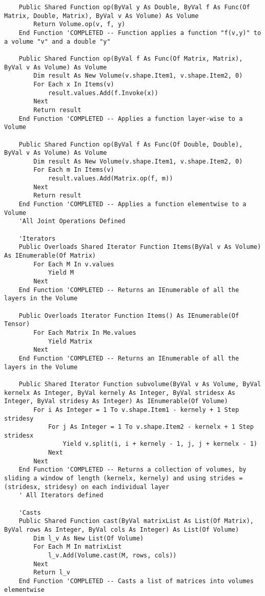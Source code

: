 \begin{verbatim}
    Public Shared Function op(ByVal y As Double, ByVal f As Func(Of Matrix, Double, Matrix), ByVal v As Volume) As Volume
        Return Volume.op(v, f, y)
    End Function 'COMPLETED -- Function applies a function "f(v,y)" to a volume "v" and a double "y"

    Public Shared Function op(ByVal f As Func(Of Matrix, Matrix), ByVal v As Volume) As Volume
        Dim result As New Volume(v.shape.Item1, v.shape.Item2, 0)
        For Each x In Items(v)
            result.values.Add(f.Invoke(x))
        Next
        Return result
    End Function 'COMPLETED -- Applies a function layer-wise to a Volume

    Public Shared Function op(ByVal f As Func(Of Double, Double), ByVal v As Volume) As Volume
        Dim result As New Volume(v.shape.Item1, v.shape.Item2, 0)
        For Each m In Items(v)
            result.values.Add(Matrix.op(f, m))
        Next
        Return result
    End Function 'COMPLETED -- Applies a function elementwise to a Volume
    'All Joint Operations Defined

    'Iterators
    Public Overloads Shared Iterator Function Items(ByVal v As Volume) As IEnumerable(Of Matrix)
        For Each M In v.values
            Yield M
        Next
    End Function 'COMPLETED -- Returns an IEnumerable of all the layers in the Volume

    Public Overloads Iterator Function Items() As IEnumerable(Of Tensor)
        For Each Matrix In Me.values
            Yield Matrix
        Next
    End Function 'COMPLETED -- Returns an IEnumerable of all the layers in the Volume

    Public Shared Iterator Function subvolume(ByVal v As Volume, ByVal kernelx As Integer, ByVal kernely As Integer, ByVal stridesx As Integer, ByVal stridesy As Integer) As IEnumerable(Of Volume)
        For i As Integer = 1 To v.shape.Item1 - kernely + 1 Step stridesy
            For j As Integer = 1 To v.shape.Item2 - kernelx + 1 Step stridesx
                Yield v.split(i, i + kernely - 1, j, j + kernelx - 1)
            Next
        Next
    End Function 'COMPLETED -- Returns a collection of volumes, by sliding a window of length (kernelx, kernely) and using strides = (stridesx, stridesy) on each individual layer
    ' All Iterators defined

    'Casts
    Public Shared Function cast(ByVal matrixList As List(Of Matrix), ByVal rows As Integer, ByVal cols As Integer) As List(Of Volume)
        Dim l_v As New List(Of Volume)
        For Each M In matrixList
            l_v.Add(Volume.cast(M, rows, cols))
        Next
        Return l_v
    End Function 'COMPLETED -- Casts a list of matrices into volumes elementwise


\end{verbatim}
